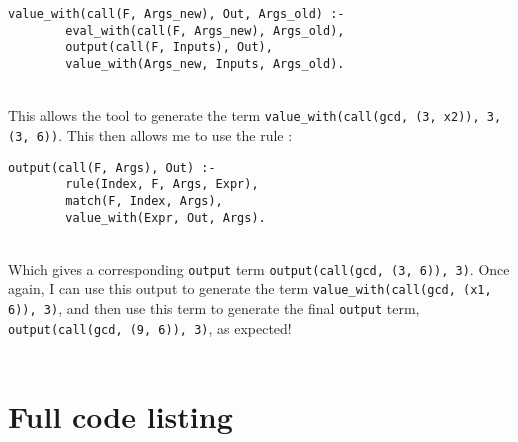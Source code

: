 \begin{lstlisting}[firstnumber=79]
value_with(call(F, Args_new), Out, Args_old) :- 
		eval_with(call(F, Args_new), Args_old), 
		output(call(F, Inputs), Out), 
		value_with(Args_new, Inputs, Args_old).
\end{lstlisting}
\mbox{} \\
This allows the tool to generate the term \lstinline{value_with(call(gcd, (3, x2)), 3, (3, 6))}. This then allows me to use the rule : \\%

\begin{lstlisting}[firstnumber=55]
output(call(F, Args), Out) :- 
		rule(Index, F, Args, Expr), 
		match(F, Index, Args),
		value_with(Expr, Out, Args).
\end{lstlisting}
\mbox{} \\
Which gives a corresponding \lstinline{output} term \lstinline{output(call(gcd, (3, 6)), 3)}. Once again, I can use this output to generate the term \lstinline{value_with(call(gcd, (x1, 6)), 3)}, and then use this term to generate the final \lstinline{output} term, \lstinline{output(call(gcd, (9, 6)), 3)}, as expected! \\ \\%

\pagebreak

\section{Full code listing}


\pagebreak
%
%
